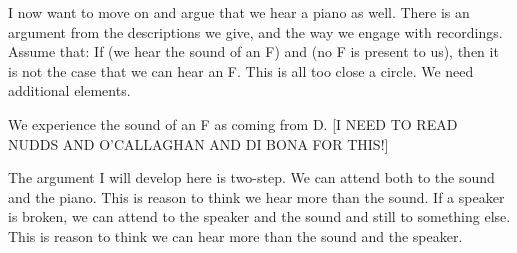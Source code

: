 \documentclass[sloppy, journal, git, bytitle, dodraft]{humapap}
\begin{document}




\sect I now want to move on and argue that we hear a piano as well. 
There is an argument from the descriptions we give, and the way we engage with recordings.
Assume that: If (we hear the sound of an F) and (no F is present to us), then it is not the case that we can hear an F. This is all too close a circle. We need additional elements. 

We experience the sound of an F as coming from D. [I NEED TO READ NUDDS AND O'CALLAGHAN AND DI BONA FOR THIS!] 


The argument I will develop here is two-step. We can attend both to the sound and the piano. This is reason to think we hear more than the sound. If a speaker is broken, we can attend to the speaker and the sound and still to something else. This is reason to think we can hear more than the sound and the speaker.
\end{document}
